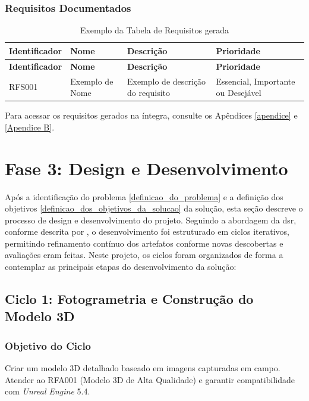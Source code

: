 \subsubsection{Requisitos Documentados}
\label{sec:requisitos_documentados}
{\small 
\begin{longtable}{|p{2.5cm}|p{4cm}|p{6cm}|p{2cm}|}
\caption{Exemplo da Tabela de Requisitos gerada}
\label{table:exemplo_tabela_requisitos} \\
\hline
\textbf{Identificador} & \textbf{Nome} & \textbf{Descrição} & \textbf{Prioridade} \\
\hline
\endfirsthead
\hline
\textbf{Identificador} & \textbf{Nome} & \textbf{Descrição} & \textbf{Prioridade} \\
\hline
\endhead
RFS001 & Exemplo de Nome & Exemplo de descrição do requisito & Essencial, Importante ou Desejável \\ \hline
\end{longtable}
}
Para acessar os requisitos gerados na íntegra, consulte os Apêndices \ref{apendice} e \ref{Apendice B}.


\section{Fase 3: Design e Desenvolvimento}\label{sec: Fase 3 design e desenvolvimento}
Após a identificação do problema \ref{definicao_do_problema} e a definição dos objetivos \ref{definicao_dos_objetivos_da_solucao} da solução, esta seção descreve o processo de design e desenvolvimento do projeto. Seguindo a abordagem da \gls{dsr}, conforme descrita por \cite{peffers2007design}, o desenvolvimento foi estruturado em ciclos iterativos, permitindo refinamento contínuo dos artefatos conforme novas descobertas e avaliações eram feitas.
Neste projeto, os ciclos foram organizados de forma a contemplar as principais etapas do desenvolvimento da solução:

\subsection*{Ciclo 1: Fotogrametria e Construção do Modelo 3D} \label{subsec:ciclo1}

\subsubsection*{Objetivo do Ciclo}
Criar um modelo 3D detalhado baseado em imagens capturadas em campo. Atender ao RFA001 (Modelo 3D de Alta Qualidade) e garantir compatibilidade com \textit{Unreal Engine} 5.4. 

